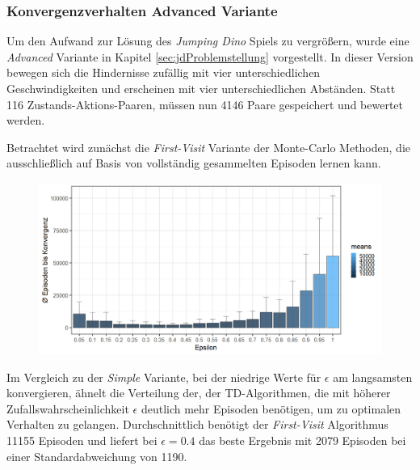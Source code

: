 \subsubsection{Konvergenzverhalten Advanced Variante}
Um den Aufwand zur Lösung des \textit{Jumping Dino} Spiels zu vergrößern, wurde eine \textit{Advanced} Variante in Kapitel \ref{sec:jdProblemstellung} vorgestellt. In dieser Version bewegen sich die Hindernisse zufällig mit vier unterschiedlichen Geschwindigkeiten und erscheinen  mit vier unterschiedlichen Abständen. Statt 116 Zustands-Aktions-Paaren, müssen nun 4146 Paare gespeichert und bewertet werden.
\par 
Betrachtet wird zunächst die \textit{First-Visit} Variante der Monte-Carlo Methoden, die ausschließlich auf Basis von vollständig gesammelten Episoden lernen kann.
\begin{figure}[H]
    \centering
    \includegraphics[width=\textwidth]{images/AdvancedZ3B1MonteCarloA}
    \label{fig:test1}
\end{figure}
Im Vergleich zu der \textit{Simple} Variante, bei der niedrige Werte für $\epsilon$ am langsamsten konvergieren, ähnelt die Verteilung der, der TD-Algorithmen, die mit höherer Zufallswahrscheinlichkeit $\epsilon$ deutlich mehr Episoden benötigen, um zu optimalen Verhalten zu gelangen. Durchschnittlich benötigt der \textit{First-Visit} Algorithmus 11155 Episoden und liefert bei $\epsilon = 0.4$ das beste Ergebnis mit 2079 Episoden bei einer Standardabweichung von 1190. 
\par 
